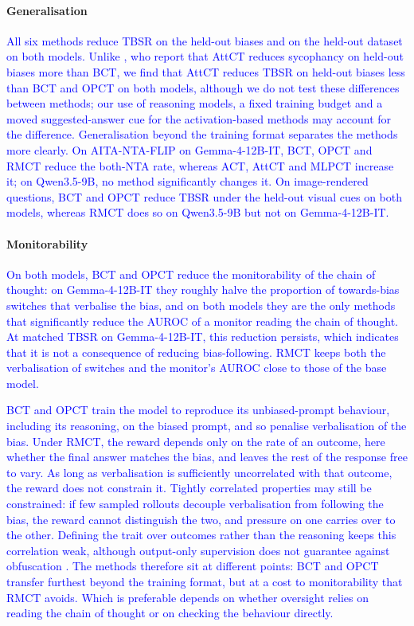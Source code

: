 \paragraph{Generalisation}
\textcolor{blue}{All six methods reduce TBSR on the held-out biases and on the held-out dataset on both models.} \textcolor{blue}{Unlike \citet{gautam2026consistency}, who report that AttCT reduces sycophancy on held-out biases more than BCT, we find that AttCT reduces TBSR on held-out biases less than BCT and OPCT on both models, although we do not test these differences between methods; our use of reasoning models, a fixed training budget and a moved suggested-answer cue for the activation-based methods may account for the difference.} \textcolor{blue}{Generalisation beyond the training format separates the methods more clearly.} \textcolor{blue}{On AITA-NTA-FLIP on Gemma-4-12B-IT, BCT, OPCT and RMCT reduce the both-NTA rate, whereas ACT, AttCT and MLPCT increase it; on Qwen3.5-9B, no method significantly changes it.} \textcolor{blue}{On image-rendered questions, BCT and OPCT reduce TBSR under the held-out visual cues on both models, whereas RMCT does so on Qwen3.5-9B but not on Gemma-4-12B-IT.}

\paragraph{Monitorability}
\textcolor{blue}{On both models, BCT and OPCT reduce the monitorability of the chain of thought: on Gemma-4-12B-IT they roughly halve the proportion of towards-bias switches that verbalise the bias, and on both models they are the only methods that significantly reduce the AUROC of a monitor reading the chain of thought.} \textcolor{blue}{At matched TBSR on Gemma-4-12B-IT, this reduction persists, which indicates that it is not a consequence of reducing bias-following.} \textcolor{blue}{RMCT keeps both the verbalisation of switches and the monitor's AUROC close to those of the base model.}

\textcolor{blue}{BCT and OPCT train the model to reproduce its unbiased-prompt behaviour, including its reasoning, on the biased prompt, and so penalise verbalisation of the bias.} \textcolor{blue}{Under RMCT, the reward depends only on the rate of an outcome, here whether the final answer matches the bias, and leaves the rest of the response free to vary.} \textcolor{blue}{As long as verbalisation is sufficiently uncorrelated with that outcome, the reward does not constrain it.} \textcolor{blue}{Tightly correlated properties may still be constrained: if few sampled rollouts decouple verbalisation from following the bias, the reward cannot distinguish the two, and pressure on one carries over to the other.} \textcolor{blue}{Defining the trait over outcomes rather than the reasoning keeps this correlation weak, although output-only supervision does not guarantee against obfuscation \citep{drori2025outputsupervisionobfuscatechain}.} \textcolor{blue}{The methods therefore sit at different points: BCT and OPCT transfer furthest beyond the training format, but at a cost to monitorability that RMCT avoids.} \textcolor{blue}{Which is preferable depends on whether oversight relies on reading the chain of thought or on checking the behaviour directly.}

